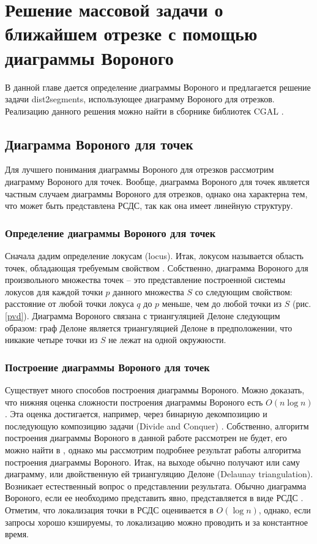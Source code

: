 \chapter{Решение массовой задачи о ближайшем отрезке с помощью диаграммы Вороного}
\label{chapSVD}

В данной главе дается определение диаграммы Вороного и предлагается
решение задачи dist2segments, использующее диаграмму Вороного для
отрезков. Реализацию данного решения можно найти в сборнике библиотек
CGAL \cite{CGAL}.

\section{Диаграмма Вороного для точек}

Для лучшего понимания диаграммы Вороного для отрезков рассмотрим
диаграмму Вороного для точек. Вообще, диаграмма Вороного для точек
является частным случаем диаграммы
Вороного для отрезков, однако она
характерна тем, что может быть представлена РСДС, так как она имеет
линейную структуру.

\subsection{Определение диаграммы Вороного для точек}

Сначала дадим определение локусам (locus). Итак, локусом называется
область точек, обладающая требуемым свойством \cite{PrSh}. Собственно, диаграмма
Вороного для произвольного множества точек -- это представление
построенной системы локусов для каждой точки $p$ данного множества $S$ со
следующим свойством: расстояние от любой точки локуса $q$ до $p$ меньше, чем
до любой точки из $S$ (рис. \ref{pvd}). Диаграмма Вороного связана с триангуляцией Делоне \cite{PrSh, CGAL} следующим
образом: граф Делоне является триангуляцией Делоне в предположении, что
никакие четыре точки из $S$ не лежат на одной окружности.


\subsection{Построение диаграммы Вороного для точек}

Существует много способов построения диаграммы Вороного. Можно
доказать, что нижняя оценка сложности построения диаграммы Вороного есть
$O(n \log n)$. Эта оценка достигается, например, через бинарную декомпозицию и
последующую композицию задачи (Divide and Conquer) \cite{PrSh}. Собственно, алгоритм
построения диаграммы Вороного в данной работе рассмотрен не будет, его
можно найти в \cite{PrSh, CGAL}, однако мы рассмотрим подробнее результат работы
алгоритма построения диаграммы Вороного. Итак, на выходе обычно получают
или саму диаграмму, или двойственную ей триангуляцию Делоне (Delaunay
triangulation). Возникает естественный вопрос о представлении результата.
Обычно диаграмма Вороного, если ее необходимо представить явно,
представляется в виде РСДС \cite{PrSh}. Отметим, что локализация точки в РСДС
оценивается в $O(\log n)$, однако, если запросы хорошо кэшируемы, то
локализацию можно проводить и за константное время.

